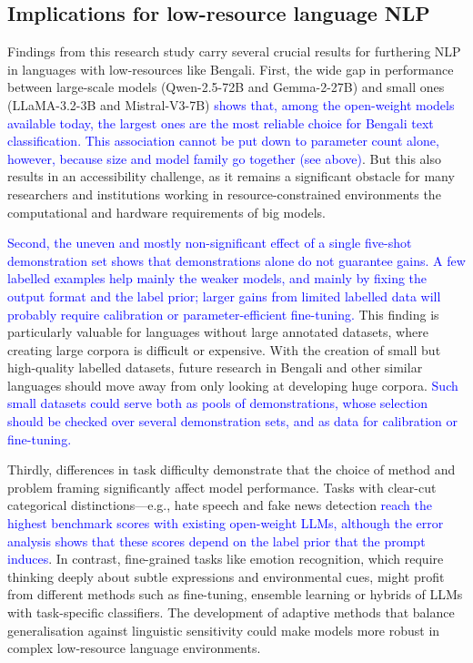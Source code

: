 \documentclass[10pt,letterpaper]{article}
\newcommand{\rev}[1]{\textcolor{blue}{#1}}
\begin{document}
\subsection*{Implications for low-resource language NLP}

Findings from this research study carry several crucial results for furthering NLP in languages with low-resources like Bengali. First, the wide gap in performance between large-scale models (Qwen-2.5-72B and Gemma-2-27B) and small ones (LLaMA-3.2-3B and Mistral-V3-7B) \rev{shows that, among the open-weight models available today, the largest ones are the most reliable choice for Bengali text classification. This association cannot be put down to parameter count alone, however, because size and model family go together (see above)}. But this also results in an accessibility challenge, as it remains a significant obstacle for many researchers and institutions working in resource-constrained environments the computational and hardware requirements of big models.

\rev{Second, the uneven and mostly non-significant effect of a single five-shot demonstration set shows that demonstrations alone do not guarantee gains. A few labelled examples help mainly the weaker models, and mainly by fixing the output format and the label prior; larger gains from limited labelled data will probably require calibration or parameter-efficient fine-tuning.} This finding is particularly valuable for languages without large annotated datasets, where creating large corpora is difficult or expensive. With the creation of small but high-quality labelled datasets, future research in Bengali and other similar languages should move away from only looking at developing huge corpora. \rev{Such small datasets could serve both as pools of demonstrations, whose selection should be checked over several demonstration sets, and as data for calibration or fine-tuning.}

Thirdly, differences in task difficulty demonstrate that the choice of method and problem framing significantly affect model performance. Tasks with clear-cut categorical distinctions—e.g., hate speech and fake news detection \rev{reach the highest benchmark scores with existing open-weight LLMs, although the error analysis shows that these scores depend on the label prior that the prompt induces}. In contrast, fine-grained tasks like emotion recognition, which require thinking deeply about subtle expressions and environmental cues, might profit from different methods such as fine-tuning, ensemble learning or hybrids of LLMs with task-specific classifiers. The development of adaptive methods that balance generalisation against linguistic sensitivity could make models more robust in complex low-resource language environments.
\end{document}
